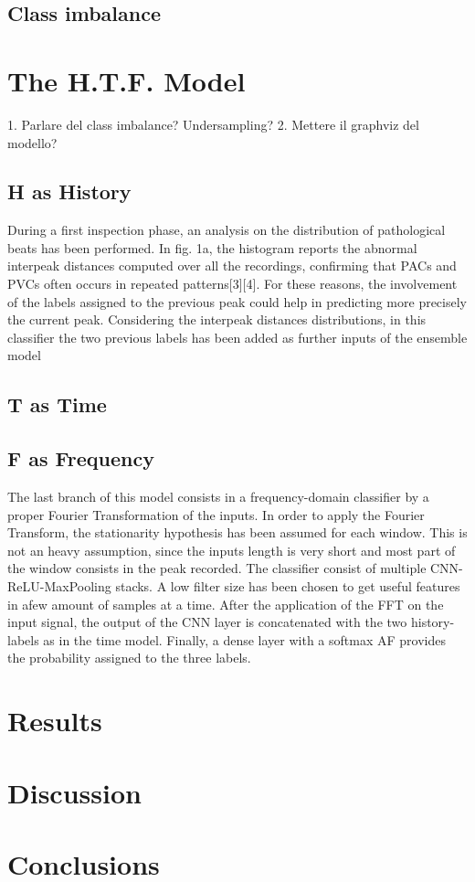 \documentclass[conference]{IEEEtran}
\begin{document}
\subsection{Class imbalance}

\section{The H.T.F. Model}
1. Parlare del class imbalance? Undersampling? 2. Mettere il graphviz
del modello? 
\subsection{H as History}
During a first inspection phase, an analysis on the distribution of
pathological beats has been performed. In fig. 1a, the histogram
reports the abnormal interpeak distances computed over all the
recordings, confirming that PACs and PVCs often occurs in repeated
patterns[3][4]. For these reasons, the involvement of the labels
assigned to the previous peak could help in predicting more precisely
the current peak. Considering the interpeak distances distributions,
in this classifier the two previous labels has been added as further
inputs of the ensemble model

\subsection{T as Time}
\subsection{F as Frequency}
The last branch of this model consists in a frequency-domain
classifier by a proper Fourier Transformation of the inputs. In order
to apply the Fourier Transform, the stationarity hypothesis has been
assumed for each window. This is not an heavy assumption, since the
inputs length is very short and most part of the window consists in
the peak recorded. The classifier consist of multiple
CNN-ReLU-MaxPooling stacks. A low filter size has been chosen to get
useful features in afew amount of samples at a time. After the
application of the FFT on the input signal, the output of the CNN
layer is concatenated with the two history-labels as in the time
model. Finally, a dense layer with a softmax AF provides the
probability assigned to the three labels. 

\section{Results}

\section{Discussion}

\section{Conclusions}
\end{document}
